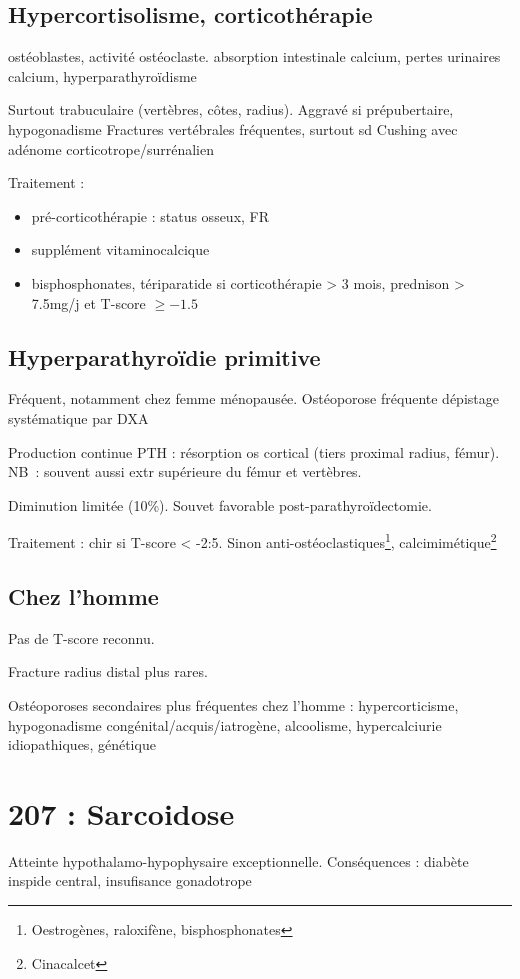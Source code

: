 \documentclass[11pt]{article}
\begin{document}
\subsection{Hypercortisolisme, corticothérapie}
\label{sec:org7e0c7a4}

\dec ostéoblastes, \inc activité ostéoclaste. \dec absorption intestinale
calcium, \inc pertes urinaires calcium, hyperparathyroïdisme

Surtout trabuculaire (vertèbres, côtes, radius). Aggravé si prépubertaire, hypogonadisme
Fractures vertébrales fréquentes, surtout sd Cushing avec adénome
corticotrope/surrénalien

Traitement : 
\begin{itemize}
\item pré-corticothérapie : status osseux, FR
\item supplément vitaminocalcique
\item bisphosphonates, tériparatide si corticothérapie > 3 mois, prednison > 7.5mg/j
et T-score \(\ge -1.5\)
\end{itemize}

\subsection{Hyperparathyroïdie primitive}
\label{sec:orgd4add0f}
Fréquent, notamment chez femme ménopausée. Ostéoporose fréquente \thus dépistage
systématique par DXA

Production continue PTH : \inc résorption os cortical (tiers proximal radius,
fémur). NB : souvent aussi extr supérieure du fémur et vertèbres. 

Diminution limitée (10\%). Souvet favorable post-parathyroïdectomie.

Traitement : chir si T-score < -2:5. Sinon anti-ostéoclastiques\footnote{Oestrogènes, raloxifène, bisphosphonates}, calcimimétique\footnote{Cinacalcet}

\subsection{Chez l'homme}
\label{sec:org17258f9}
Pas de T-score reconnu. 

Fracture radius distal plus rares.

Ostéoporoses secondaires plus fréquentes chez l'homme : hypercorticisme,
hypogonadisme congénital/acquis/iatrogène, alcoolisme, hypercalciurie
idiopathiques, génétique
\section{207 : Sarcoidose}
\label{sec:org7d7c583}
Atteinte hypothalamo-hypophysaire exceptionnelle. Conséquences : diabète
inspide central, insufisance gonadotrope
\end{document}
